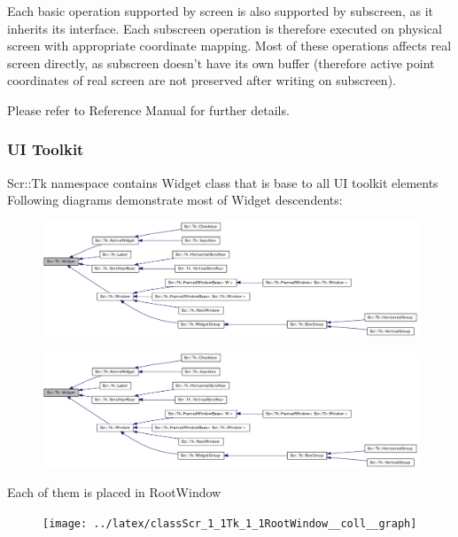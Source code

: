   \important

  Each basic operation supported by screen is also supported by
  subscreen, as it inherits its interface. Each subscreen operation
  is therefore executed on physical screen with appropriate coordinate
  mapping. Most of these operations affects real screen directly, as
  subscreen doesn't have its own buffer (therefore active point
  coordinates of real screen are not preserved after writing on
  subscreen).

  Please refer to Reference Manual for further details.

\subsubsection{UI Toolkit}
  Scr::Tk namespace contains Widget class that is base to all UI toolkit elements
  Following diagrams demonstrate most of Widget descendents:


  \begin{figure}[H]
  \begin{center}
  \leavevmode\includegraphics[width=\linewidth,trim=0 0 430pt  0,clip=true]{graphics/classScr_1_1Tk_1_1Widget__inherit__graph}
  \end{center}
  \end{figure}


  \begin{figure}[H]
  \begin{center}
  \leavevmode\includegraphics[width=\linewidth,trim=250pt  0  0 150pt ,clip=true]{graphics/classScr_1_1Tk_1_1Widget__inherit__graph}
  \end{center}
  \end{figure}

  Each of them is placed in RootWindow
  
  \begin{figure}[H]
  \begin{center}
  \leavevmode\texttt{[image: ../latex/classScr\_1\_1Tk\_1\_1RootWindow\_\_coll\_\_graph]}
  \end{center}
  \end{figure}



